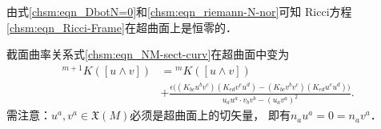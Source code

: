 由式\eqref{chsm:eqn_DbotN=0}和\eqref{chsm:eqn_riemann-N-nor}可知
Ricci方程\eqref{chsm:eqn_Ricci-Frame}在超曲面上是恒零的．

截面曲率关系式\eqref{chsm:eqn_NM-sect-curv}在超曲面中变为
\begin{equation}   \label{chsm:eqn_SigmaM-sect-curv}
    \begin{aligned}
    {}^{m+1} K([u\wedge v]) &= {}^{m} K([u\wedge v]) \\ 
    &+ \frac{\epsilon \bigl( 
        (K_{bc} u^b v^c) (K_{ed} v^e u^d)
        -(K_{bc} v^b v^c) (K_{ed} u^e u^d) 
        \bigr)}
    {{u}_a{u}^a \cdot {v}_b{v}^b - ({u}_a{v}^a)^2 }  .
    \end{aligned}
\end{equation} %
需注意：$u^a,v^a\in \mathfrak{X}(M)$必须是超曲面上的切矢量，
即有$n_a u^a =0 = n_av^a$．



